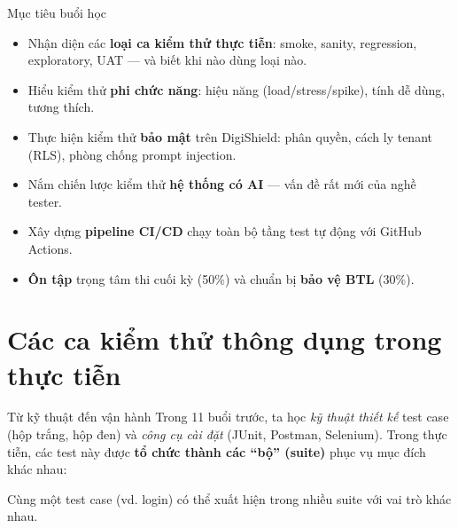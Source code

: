 \documentclass[aspectratio=169,12pt]{beamer}
\begin{document}
\begin{frame}{Mục tiêu buổi học}
  \begin{itemize}
    \item Nhận diện các \textbf{loại ca kiểm thử thực tiễn}: smoke, sanity, regression, exploratory, UAT --- và biết khi nào dùng loại nào.
    \item Hiểu kiểm thử \textbf{phi chức năng}: hiệu năng (load/stress/spike), tính dễ dùng, tương thích.
    \item Thực hiện kiểm thử \textbf{bảo mật} trên DigiShield: phân quyền, cách ly tenant (RLS), phòng chống prompt injection.
    \item Nắm chiến lược kiểm thử \textbf{hệ thống có AI} --- vấn đề rất mới của nghề tester.
    \item Xây dựng \textbf{pipeline CI/CD} chạy toàn bộ tầng test tự động với GitHub Actions.
    \item \textbf{Ôn tập} trọng tâm thi cuối kỳ (50\%) và chuẩn bị \textbf{bảo vệ BTL} (30\%).
  \end{itemize}
\end{frame}

\section{Các ca kiểm thử thông dụng trong thực tiễn}

\begin{frame}{Từ kỹ thuật đến vận hành}
  Trong 11 buổi trước, ta học \emph{kỹ thuật thiết kế} test case (hộp trắng, hộp đen) và \emph{công cụ cài đặt} (JUnit, Postman, Selenium). Trong thực tiễn, các test này được \textbf{tổ chức thành các ``bộ'' (suite)} phục vụ mục đích khác nhau:
  \vspace{0.3em}
  \begin{center}
  \end{center}
  \vspace{0.3em}
  Cùng một test case (vd. login) có thể xuất hiện trong nhiều suite với vai trò khác nhau.
\end{frame}
\end{document}

